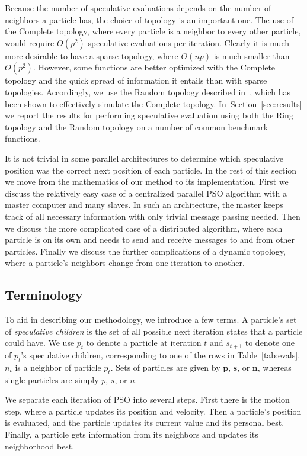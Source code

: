 \documentclass[journal,letterpaper]{IEEEtran}
\renewcommand{\sec}[1]{Section~\ref{sec:#1}}
\providecommand{\p}{\ensuremath{p}}
\providecommand{\pset}{\ensuremath{\mathbf{p}}}
\providecommand{\s}{\ensuremath{s}}
\providecommand{\sset}{\ensuremath{\mathbf{s}}}
\providecommand{\n}{\ensuremath{n}}
\providecommand{\nset}{\ensuremath{\mathbf{n}}}
\begin{document}
Because the number of speculative evaluations depends on the number of
neighbors a particle has, the choice of topology is an important one.  The use
of the Complete topology, where every particle is a neighbor to every other
particle, would require $O(p^2)$ speculative evaluations per iteration.
Clearly it is much more desirable to have a sparse topology, where $O(np)$ is
much smaller than $O(p^2)$.  However, some functions are better optimized with
the Complete topology and the quick spread of information it entails than with
sparse topologies.  Accordingly, we use the Random topology described
in~\cite{mcnabb-2009-large-particle-swarms}, which has been shown to
effectively simulate the Complete topology.  In~\sec{results} we report the
results for performing speculative evaluation using both the Ring topology and
the Random topology on a number of common benchmark functions.

It is not trivial in some parallel architectures to determine which speculative
position was the correct next position of each particle.  In the rest of this
section we move from the mathematics of our method to its implementation.
First we discuss the relatively easy case of a centralized parallel PSO
algorithm with a master computer and many slaves.  In such an architecture, the
master keeps track of all necessary information with only trivial message
passing needed.  Then we discuss the more complicated case of a distributed
algorithm, where each particle is on its own and needs to send and receive
messages to and from other particles.  Finally we discuss the further
complications of a dynamic topology, where a particle's neighbors change from
one iteration to another.

\subsection{Terminology}

To aid in describing our methodology, we introduce a few terms.  A particle's
set of \emph{speculative children} is the set of all possible next iteration
states that a particle could have.  We use $\p_t$ to denote a particle at
iteration $t$ and $\s_{t+1}$ to denote one of $\p_t$'s speculative children,
corresponding to one of the rows in Table~\ref{tab:evals}.  $\n_t$ is a
neighbor of particle $\p_t$.  Sets of particles are given by $\pset$, $\sset$,
or $\nset$, whereas single particles are simply $\p$, $\s$, or $\n$.

We separate each iteration of PSO into several steps.  First there is the
motion step, where a particle updates its position and velocity.  Then a
particle's position is evaluated, and the particle updates its current value
and its personal best.  Finally, a particle gets information from its neighbors
and updates its neighborhood best.
\end{document}
